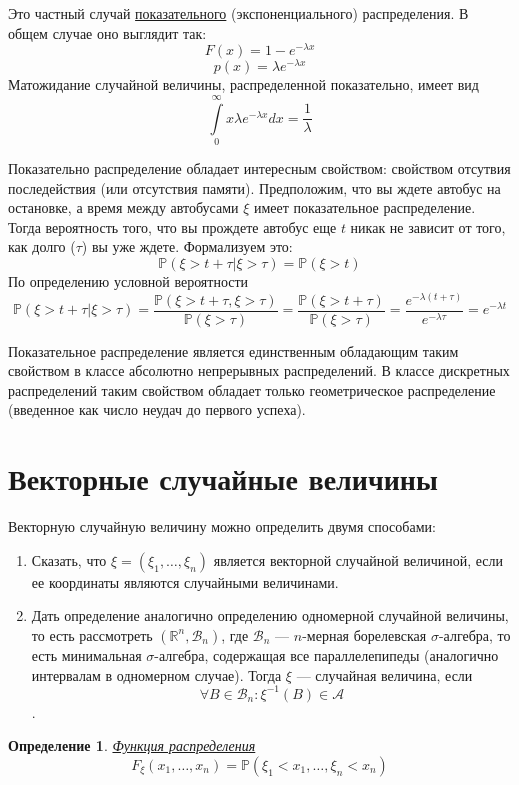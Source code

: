 \documentclass[12pt]{article}
\newtheorem{Def}{Определение}
\numberwithin{Th}{section}
\numberwithin{Def}{section}
\numberwithin{Lem}{section}
\numberwithin{St}{section}
\numberwithin{equation}{section}
\newcommand\Pro{\mathbb{P}} %
\newcommand\Ev{\mathscr{A}} %
\newcommand\Bor{\mathscr{B}} %
\newcommand\Real{\mathbb{R}} %
\begin{document}
Это частный случай \underline{показательного} (экспоненциального) распределения. В общем случае оно выглядит так:
$$F(x) = 1 - e^{-\lambda x}$$
$$p(x) = \lambda e^{-\lambda x}$$
Матожидание случайной величины, распределенной показательно, имеет вид
$$\int\limits_0^{\infty} x\lambda e^{-\lambda x}dx = \frac1{\lambda}$$

Показательно распределение обладает интересным свойством: свойством отсутвия последействия (или отсутствия памяти). Предположим, что вы ждете автобус на 
остановке, а время между автобусами $\xi$ имеет показательное распределение. Тогда вероятность того, что вы прождете автобус еще $t$ никак не зависит от того, 
как долго ($\tau$) вы уже ждете. Формализуем это:
$$ \Pro(\xi > t + \tau | \xi > \tau) = \Pro(\xi > t)$$
По определению условной вероятности
$$\Pro(\xi > t + \tau | \xi > \tau) = \frac{\Pro(\xi > t + \tau, \xi > \tau)}{\Pro(\xi > \tau)} = \frac{\Pro(\xi > t + \tau)}{\Pro(\xi > \tau)} = \frac{e^{-\lambda(t+\tau)}}{e^{-\lambda \tau}} = e^{-\lambda t}$$

Показательное распределение является единственным обладающим таким свойством в классе абсолютно непрерывных распределений. В классе дискретных распределений таким свойством обладает только геометрическое распределение (введенное как число неудач до первого успеха).

\newpage
\section{Векторные случайные величины}
Векторную случайную величину можно определить двумя способами:
\begin{enumerate}
	\item Сказать, что $\xi = (\xi_1, \ldots, \xi_n)$ является векторной случайной величиной, если ее координаты являются случайными величинами.
	\item Дать определение аналогично определению одномерной случайной величины, то есть рассмотреть $(\Real^n, \Bor_n)$, где $\Bor_n$ --- $n$-мерная борелевская
	$\sigma$-алгебра, то есть минимальная $\sigma$-алгебра, содержащая все параллелепипеды (аналогично интервалам в одномерном случае). Тогда $\xi$ --- случайная величина, если $$\forall B \in \Bor_n \colon \xi^{-1}(B) \in \Ev$$. 
\end{enumerate}

\begin{Def}
\underline{Функция распределения} $$F_\xi(x_1, \ldots, x_n) = \Pro(\xi_1 < x_1, \ldots, \xi_n < x_n)$$
\end{Def}
\end{document}
